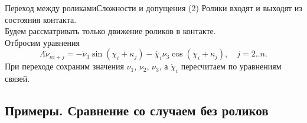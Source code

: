 \documentclass{beamer}
\begin{document}
\begin{frame}{Переход между роликами}{Сложности и допущения}
    \textcolor{Periwinkle}{(2) Ролики входят и выходят из состояния контакта.}\\
    Будем рассматривать только движение роликов в контакте.\\
    Отбросим уравнения
    $$
    \Lambda\dot{\nu}_{ni+j} = -\dot{\nu}_3\sin(\chi_i+\kappa_j) - \dot{\chi_i}\nu_3\cos(\chi_i+\kappa_j), \quad j = 2..n.
    $$
    При переходе сохраним значения $\nu_1$, $\nu_2$, 
    $\nu_3$, а $\dot\chi_i$ пересчитаем по уравнениям связей.
    \begin{figure}
        \centering
    \end{figure}
\end{frame}


\subsection{Примеры. Сравнение со случаем без роликов}
\end{document}
